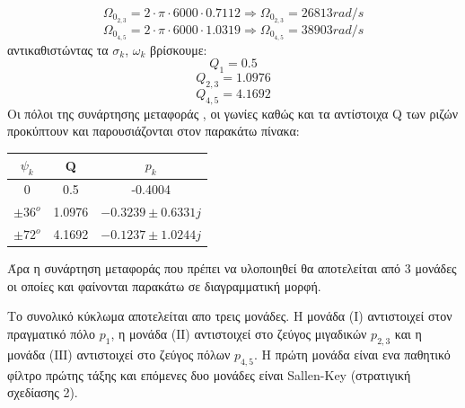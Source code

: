 \documentclass{article}
\begin{document}
\begin{equation*}
Ω_{0_{2,3}} = 2\cdot π \cdot 6000 \cdot 0.7112 \Rightarrow \boxed{Ω_{0_{2,3}} = 26813 rad/s}
\end{equation*}
\begin{equation*}
Ω_{0_{4,5}} = 2\cdot π \cdot 6000 \cdot 1.0319 \Rightarrow \boxed{Ω_{0_{4,5}} = 38903 rad/s}
\end{equation*}
αντικαθιστώντας τα $σ_k$, $ω_k$ βρίσκουμε:
\begin{equation*}
\boxed{Q_{{1}} =  0.5}
\end{equation*}
\begin{equation*}
\boxed{Q_{2,3} =  1.0976}
\end{equation*}
\begin{equation*}
\boxed{Q_{4,5} =  4.1692}
\end{equation*}
Οι πόλοι της συνάρτησης μεταφοράς , οι γωνίες καθώς και τα αντίστοιχα Q των ριζών προκύπτουν και παρουσιάζονται στον παρακάτω πίνακα:

 
\begin{center}

 \begin{tabular}{|c|c|c|}
        \hline
       \qquad $ψ_k$ \qquad \qquad &\qquad \qquad Q \qquad \qquad \qquad & \qquad \qquad $p_k$ \qquad \qquad \qquad \\
        \hline
        $0$ & 0.5 & -0.4004 \\
        \hline
        $\pm36^o$ & 1.0976 & $ -0.3239 \pm 0.6331j$\\
        \hline
        $\pm72^o$ & 4.1692 & $-0.1237 \pm 1.0244j$\\
        \hline
        \end{tabular}
\end{center}
Άρα η συνάρτηση μεταφοράς που πρέπει να υλοποιηθεί θα αποτελείται από 3 μονάδες οι οποίες και φαίνονται παρακάτω σε διαγραμματική μορφή. \\
\begin{center}
\raisebox{-6ex}{$\to$}%
%
\raisebox{-6ex}{$\to$}%
%
\raisebox{-6ex}{$\to$}%
%
\raisebox{-6ex}{$\to$}%
\end{center} 
Το συνολικό κύκλωμα αποτελείται απο τρεις μονάδες. Η μονάδα (Ι) αντιστοιχεί στον πραγματικό πόλο $p_1$, η μονάδα (ΙΙ) αντιστοιχεί στο ζεύγος μιγαδικών $p_{2,3}$ και η μονάδα (ΙΙΙ) αντιστοιχεί στο ζεύγος πόλων $p_{4,5}$. Η πρώτη μονάδα είναι ενα παθητικό φίλτρο πρώτης τάξης και επόμενες δυο μονάδες είναι Sallen-Key (στρατιγική σχεδίασης 2). 
\newpage
\end{document}
